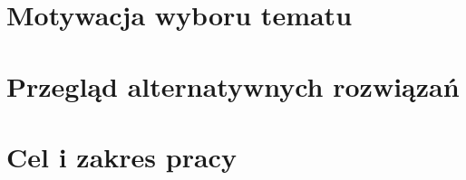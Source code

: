 

\section{Motywacja wyboru tematu}





\section{Przegląd alternatywnych rozwiązań}





\section{Cel i zakres pracy}
